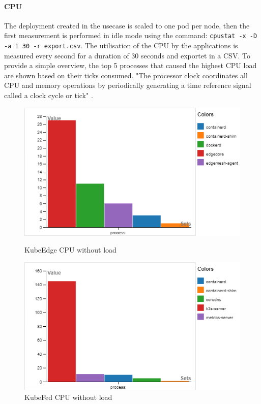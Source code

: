 \documentclass[MSC,Master,english]{twbook}%
\begin{document}
\paragraph{CPU} The deployment created in the usecase is scaled to one pod per node, then the first measurement is performed in idle mode using the command: \lstinline|cpustat -x -D -a 1 30 -r export.csv|.
The utilisation of the CPU by the applications is measured every second for a duration of 30 seconds and exportet in a CSV. To provide a simple overview, the top 5 processes that caused the highest CPU load are shown based on their ticks consumed. "The processor clock coordinates all CPU and memory operations by periodically generating a time reference signal called a clock cycle or tick" \cite{pchwnut}.

\begin{figure}[ht]
    \centering
    \begin{minipage}[b]{.49\linewidth}
        \centering
        \includegraphics[width=\textwidth]{PICs/ke-cpu-noload.png}
        \caption{KubeEdge CPU without load}
    \end{minipage}
    \begin{minipage}[b]{.49\linewidth}
        \centering
        \includegraphics[width=\textwidth]{PICs/kf-cpu-noload.png}
        \caption{KubeFed CPU without load}
    \end{minipage}
    \label{fig:cpu-load-1}
\end{figure}
\end{document}
